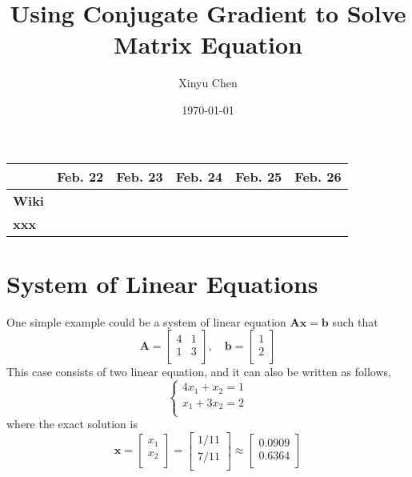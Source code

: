 \documentclass[12pt]{article}
\title{Using Conjugate Gradient to Solve Matrix Equation}
\author{Xinyu Chen}
\date{\today}
\begin{document}
\begin{table}[h]
\centering\footnotesize
\begin{tabular}{l|c|c|c|c|c}
\toprule
& Feb. 22 & Feb. 23 & Feb. 24 & Feb. 25 & Feb. 26 \\
\midrule
\textbf{Wiki} & \cellcolor{cyan} & \cellcolor{white} & \cellcolor{white} & \cellcolor{white} & \cellcolor{white} \\
\hline
\hline
\hline
\hline
\hline
\textbf{xxx} & & & & \cellcolor{cyan} & \\
\bottomrule
\end{tabular}
\end{table}

\maketitle

\section{System of Linear Equations}

One simple example could be a system of linear equation $\boldsymbol{A}\boldsymbol{{x}}=\boldsymbol{b}$ such that
\begin{equation}
\boldsymbol{A}=\begin{bmatrix}
4 & 1 \\
1 & 3 \\
\end{bmatrix},\quad\boldsymbol{b}=\begin{bmatrix}
1 \\
2 \\
\end{bmatrix}
\end{equation}
This case consists of two linear equation, and it can also be written as follows,
\begin{equation}
\left\{
\begin{aligned}
4x_1+x_2=1 \\
x_1+3x_2=2 \\
\end{aligned}
\right.
\end{equation}
where the exact solution is
\begin{equation}
\boldsymbol{x}=\begin{bmatrix}
x_1 \\
x_2 \\
\end{bmatrix}=\begin{bmatrix}
1/11 \\
7/11 \\
\end{bmatrix}\approx\begin{bmatrix}
0.0909 \\
0.6364 \\
\end{bmatrix}
\end{equation}
\end{document}
